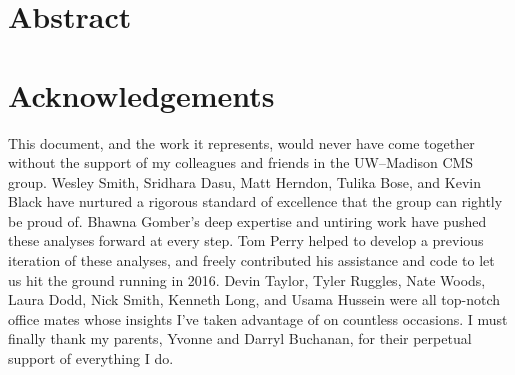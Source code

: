 \documentclass[oneside, letterpaper, 12pt, oldfontcommands]{memoir}
\begin{document}
\frontmatter


\thetitlepage
\clearpage

\thecopyrightpage
\cleardoublepage

\setcounter{page}{1}

\section{Abstract}
\uwabstract
\cleardoublepage

\section{Acknowledgements}
This document, and the work it represents, would never have come together without
the support of my colleagues and friends in the UW--Madison CMS group.
Wesley Smith, Sridhara Dasu, Matt Herndon, Tulika Bose, and Kevin Black
have nurtured a rigorous standard of excellence that the group can rightly be proud of.
Bhawna Gomber's deep expertise and untiring work have pushed these analyses
forward at every step.
Tom Perry helped to develop a previous iteration of these analyses,
and freely contributed his assistance and code to let us hit the ground running in 2016.
Devin Taylor, Tyler Ruggles, Nate Woods, Laura Dodd, Nick Smith, Kenneth Long, and
Usama Hussein were all top-notch office mates whose insights I've taken advantage of
on countless occasions.
I must finally thank my parents, Yvonne and Darryl Buchanan,
for their perpetual support of everything I do.
\clearpage

\tableofcontents* %

\mainmatter












\end{document}
